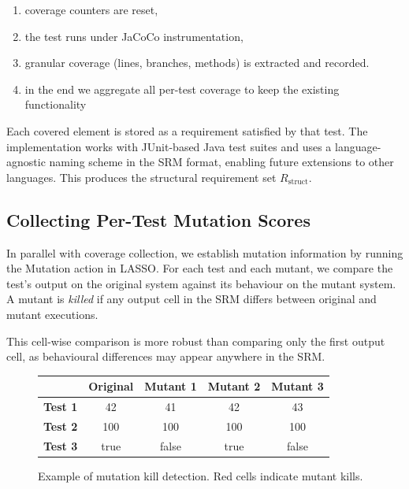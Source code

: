 \begin{enumerate}
  \item coverage counters are reset,
  \item the test runs under JaCoCo instrumentation,
  \item granular coverage (lines, branches, methods) is extracted and recorded.
  \item in the end we aggregate all per-test coverage to keep the existing functionality
\end{enumerate}

Each covered element is stored as a requirement satisfied by that test. The implementation works with JUnit-based Java test suites and uses a language-agnostic naming scheme in the SRM format, enabling future extensions to other languages. This produces the structural requirement set $R_{\text{struct}}$.

\subsection{Collecting Per-Test Mutation Scores}

In parallel with coverage collection, we establish mutation information by running the Mutation action in LASSO. For each test and each mutant, we compare the test's output on the original system against its behaviour on the mutant system. A mutant is \emph{killed} if any output cell in the SRM differs between original and mutant executions.

This cell-wise comparison is more robust than comparing only the first output cell, as behavioural differences may appear anywhere in the SRM.

\begin{figure}[H]
  \centering
  \begin{tabular}{c|cccc}
    & \textbf{Original} & \textbf{Mutant 1} & \textbf{Mutant 2} & \textbf{Mutant 3} \\
    \hline
    \textbf{Test 1} & \cellcolor{green!20}42 & \cellcolor{red!20}41 & \cellcolor{green!20}42 & \cellcolor{red!20}43 \\
    \textbf{Test 2} & \cellcolor{green!20}100 & \cellcolor{green!20}100 & \cellcolor{green!20}100 & \cellcolor{green!20}100 \\
    \textbf{Test 3} & \cellcolor{green!20}true & \cellcolor{red!20}false & \cellcolor{green!20}true & \cellcolor{red!20}false \\
  \end{tabular}
  \caption{Example of mutation kill detection. Red cells indicate mutant kills.}
  \label{fig:mutation-extraction}
\end{figure}

